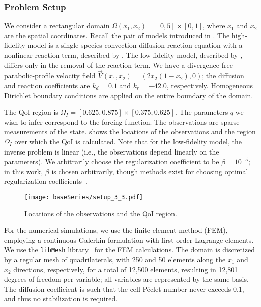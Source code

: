 \subsubsection{Problem Setup} \label{sec:cdvcdrSetup}
%
We consider a rectangular domain $\Omega(x_1,x_2)=[0,5]\times[0,1]$, where $x_1$ and $x_2$ are the spatial coordinates. Recall the pair of models introduced in . The high-fidelity model is a single-species convection-diffusion-reaction equation with a nonlinear reaction term, described by . The low-fidelity model, described by , differs only in the removal of the reaction term. We have a divergence-free parabolic-profile velocity field $\vec{V}(x_1,x_2) = (2x_2(1-x_2),0)$; the diffusion and reaction coefficients are $k_d = 0.1$ and $k_r = -42.0$, respectively. Homogeneous Dirichlet boundary conditions are applied on the entire boundary of the domain. 

The QoI region is $\Omega_I=[0.625,0.875]\times[0.375,0.625]$. The parameters $q$ we wish to infer correspond to the forcing function. The observations are sparse measurements of the state.
 shows the locations of the observations and the region $\Omega_I$ over which the QoI is calculated. Note that for the low-fidelity model, the inverse problem is linear (i.e., the observations depend linearly on the parameters). We arbitrarily choose the regularization coefficient to be $\beta=10^{-5}$; in this work, $\beta$ is chosen arbitrarily, though methods exist for choosing optimal regularization coefficients~\cite{BelgeKilmerMiller02,Calvetal00}.
%
\begin{figure}[htbp]
\centering
\texttt{[image: baseSeries/setup\_3\_3.pdf]}
\caption{Locations of the observations and the QoI region.}
\label{fig:baseSetup}
\end{figure}
%

For the numerical simulations, we use the finite element method (FEM), employing a continuous Galerkin formulation with first-order Lagrange elements. We use the \texttt{libMesh} library~\cite{libMeshPaper} for the FEM calculations.
The domain is discretized by a regular mesh of quadrilaterals, with 250 and 50 elements along the $x_1$ and $x_2$ directions, respectively, for a total of 12,500 elements, resulting in 12,801 degrees of freedom per variable; all variables are represented by the same basis. The diffusion coefficient is such that the cell P\'{e}clet number never exceeds 0.1, and thus no stabilization is required.

